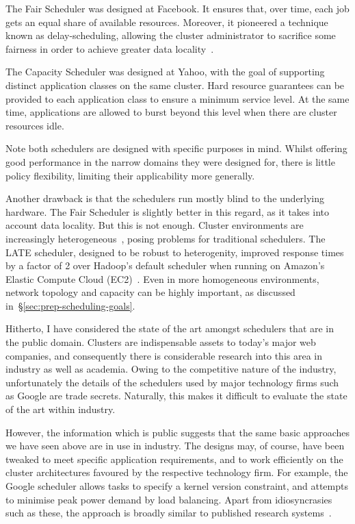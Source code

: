 The Fair Scheduler was designed at Facebook. It ensures that, over time, each job gets an equal share of available resources. Moreover, it pioneered a technique known as delay-scheduling, allowing the cluster administrator to sacrifice some fairness in order to achieve greater data locality~\cite{Zaharia:2010}. 

The Capacity Scheduler was designed at Yahoo, with the goal of supporting distinct application classes on the same cluster. Hard resource guarantees can be provided to each application class to ensure a minimum service level. At the same time, applications are allowed to burst beyond this level when there are cluster resources idle.

Note both schedulers are designed with specific purposes in mind. Whilst offering good performance in the narrow domains they were designed for, there is little policy flexibility, limiting their applicability more generally. 

Another drawback is that the schedulers run mostly blind to the underlying hardware. The Fair Scheduler is slightly better in this regard, as it takes into account data locality. But this is not enough. Cluster environments are increasingly heterogeneous~\cite{Reiss:2012}, posing problems for traditional schedulers. The LATE scheduler, designed to be robust to heterogenity, improved response times by a factor of 2 over Hadoop's default scheduler when running on Amazon's Elastic Compute Cloud (EC2)~\cite{Zaharia:2008}. Even in more homogeneous environments, network topology and capacity can be highly important, as discussed in~\S\ref{sec:prep-scheduling-goals}.

Hitherto, I have considered the state of the art amongst schedulers that are in the public domain. Clusters are indispensable assets to today's major web companies, and consequently there is considerable research into this area in industry as well as academia. Owing to the competitive nature of the industry, unfortunately the details of the schedulers used by major technology firms such as Google are trade secrets. Naturally, this makes it difficult to evaluate the state of the art within industry. 

However, the information which is public suggests that the same basic approaches we have seen above are in use in industry. The designs may, of course, have been tweaked to meet specific application requirements, and to work efficiently on the cluster architectures favoured by the respective technology firm. For example, the Google scheduler allows tasks to specify a kernel version constraint, and attempts to minimise peak power demand by load balancing. Apart from idiosyncrasies such as these, the approach is broadly similar to published research systems~\cite[\S2.1]{Sharma:2011}.

